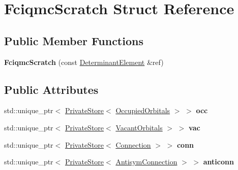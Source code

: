 \hypertarget{structFciqmcScratch}{}\section{Fciqmc\+Scratch Struct Reference}
\label{structFciqmcScratch}
\subsection*{Public Member Functions}
\begin{DoxyCompactItemize}
\item 
{\bfseries Fciqmc\+Scratch} (const \hyperlink{classDeterminantElement}{Determinant\+Element} \&ref)\hypertarget{structFciqmcScratch_ab4807f219ec8bfaec979b4e45ac2d50c}{}\label{structFciqmcScratch_ab4807f219ec8bfaec979b4e45ac2d50c}

\end{DoxyCompactItemize}
\subsection*{Public Attributes}
\begin{DoxyCompactItemize}
\item 
std\+::unique\+\_\+ptr$<$ \hyperlink{classPrivateStore}{Private\+Store}$<$ \hyperlink{structOccupiedOrbitals}{Occupied\+Orbitals} $>$ $>$ {\bfseries occ}\hypertarget{structFciqmcScratch_a876ccf9d808da2036399e38b32d7c655}{}\label{structFciqmcScratch_a876ccf9d808da2036399e38b32d7c655}

\item 
std\+::unique\+\_\+ptr$<$ \hyperlink{classPrivateStore}{Private\+Store}$<$ \hyperlink{structVacantOrbitals}{Vacant\+Orbitals} $>$ $>$ {\bfseries vac}\hypertarget{structFciqmcScratch_aa5f60fd17fb49d80dc8817570e5ace5e}{}\label{structFciqmcScratch_aa5f60fd17fb49d80dc8817570e5ace5e}

\item 
std\+::unique\+\_\+ptr$<$ \hyperlink{classPrivateStore}{Private\+Store}$<$ \hyperlink{classConnection}{Connection} $>$ $>$ {\bfseries conn}\hypertarget{structFciqmcScratch_a1d60b2dce20aa3b9d99a5c5a27cdc444}{}\label{structFciqmcScratch_a1d60b2dce20aa3b9d99a5c5a27cdc444}

\item 
std\+::unique\+\_\+ptr$<$ \hyperlink{classPrivateStore}{Private\+Store}$<$ \hyperlink{classAntisymConnection}{Antisym\+Connection} $>$ $>$ {\bfseries anticonn}\hypertarget{structFciqmcScratch_a8450fe8ed94192373d279f8fdf5374ef}{}\label{structFciqmcScratch_a8450fe8ed94192373d279f8fdf5374ef}

\end{DoxyCompactItemize}
